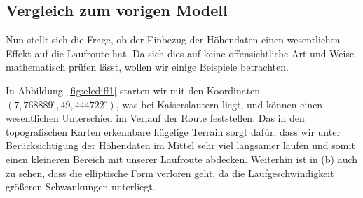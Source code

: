 \documentclass[
    paper=a4,
    DIV14,
    fontsize=12pt,
    pagesize=pdftex,
    toc=bibliographynumbered
]{scrartcl}
\numberwithin{figure}{section}
\numberwithin{equation}{section}
\numberwithin{table}{section}
\begin{document}
\subsection{Vergleich zum vorigen Modell}
Nun stellt sich die Frage, ob der Einbezug der Höhendaten einen wesentlichen Effekt auf
die Laufroute hat. Da sich dies auf keine offensichtliche Art und Weise mathematisch
prüfen lässt, wollen wir einige Beispiele betrachten.

In Abbildung~\ref{fig:elediff1} starten wir mit den Koordinaten $(7{,}768889^\circ,
49{,}444722^\circ)$, was bei Kaiserslautern liegt, und können einen wesentlichen Unterschied im
Verlauf der Route feststellen. Das in den topografischen Karten erkennbare hügelige
Terrain sorgt dafür, dass wir unter Berücksichtigung der Höhendaten im Mittel sehr viel
langsamer laufen und somit einen kleineren Bereich mit unserer Laufroute abdecken.
Weiterhin ist in (b) auch zu sehen, dass die elliptische Form verloren geht, da die
Laufgeschwindigkeit größeren Schwankungen unterliegt.
\end{document}
